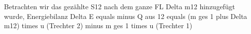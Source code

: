 Betrachten wir das gezählte S12 nach dem ganze FL Delta m12 hinzugefügt wurde, Energiebilanz  
Delta E equals minus Q aus 12  
equals (m ges 1 plus Delta m12) times u (Trechter 2)  
minus m ges 1 times u (Trechter 1)